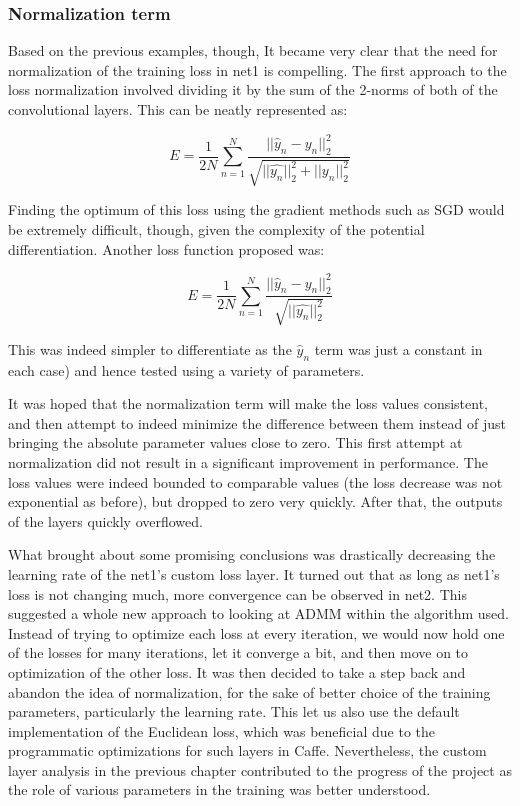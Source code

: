 \documentclass[a4paper, 12pt]{article}
\numberwithin{equation}{section}
\begin{document}
	\subsubsection{Normalization term }
	
	Based on the previous examples, though, It became very clear that the need for normalization of the training loss in net1 is compelling. The first approach to the loss normalization involved dividing it by the sum of the 2-norms of both of the convolutional layers. This can be neatly represented as:
	
	\begin{equation}
	E=\frac{1}{2N} \sum_{n=1}^{N} \frac{ ||\hat{y}_n-y_n||^2_2}{\sqrt{||\hat{y_n}||^2_2+||y_n||^2_2}} 
	\end{equation}
	
	Finding the optimum of this loss using the gradient methods such as SGD would be extremely difficult, though, given the complexity of the potential differentiation. Another loss function proposed was:
	
	\begin{equation}
	E=\frac{1}{2N} \sum_{n=1}^{N} \frac{ ||\hat{y}_n-y_n||^2_2}{\sqrt{||\hat{y_n}||^2_2}} 
	\end{equation}
	
	This was indeed simpler to differentiate as the $\hat{y}_n$ term was just a constant in each case) and hence tested using a variety of parameters.
	
	It was hoped that the normalization term will make the loss values consistent, and then attempt to indeed minimize the difference between them instead of just bringing the absolute parameter values close to zero. This first attempt at normalization did not result in a significant improvement in performance. The loss values were indeed bounded to comparable values (the loss decrease was not exponential as before), but dropped to zero very quickly. After that, the outputs of the layers quickly overflowed.
	
	What brought about some promising conclusions was drastically decreasing the learning rate of the net1's custom loss layer. It turned out that as long as net1's loss is not changing much, more convergence can be observed in net2. This suggested a whole new approach to looking at ADMM within the algorithm used. Instead of trying to optimize each loss at every iteration, we would now hold one of the losses for many iterations, let it converge a bit, and then move on to optimization of the other loss. It was then decided to take a step back and abandon the idea of normalization, for the sake of better choice of the training parameters, particularly the learning rate. This let us also use the default implementation of the Euclidean loss, which was beneficial due to the programmatic optimizations for such layers in Caffe. Nevertheless, the custom layer analysis in the previous chapter  contributed to the progress of the project as the role of various parameters in the training was better understood.
	
\end{document}

